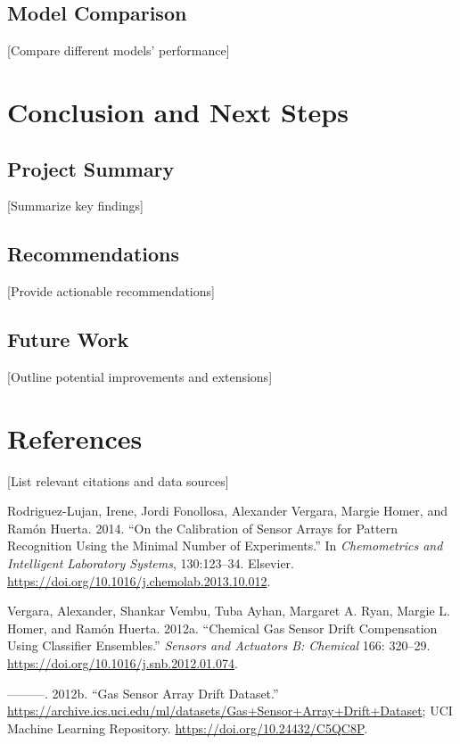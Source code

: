 \documentclass[
  letterpaper,
  DIV=11,
  numbers=noendperiod]{scrartcl}
\newlength{\cslhangindent}
\newenvironment{CSLReferences}[2] %
 {\begin{list}{}{%
  \setlength{\itemindent}{0pt}
  \setlength{\leftmargin}{0pt}
  \setlength{\parsep}{0pt}
  \ifodd #1
   \setlength{\leftmargin}{\cslhangindent}
   \setlength{\itemindent}{-1\cslhangindent}
  \fi
  \setlength{\itemsep}{#2\baselineskip}}}
 {\end{list}}
\begin{document}
\subsection{Model Comparison}\label{model-comparison}

{[}Compare different models' performance{]}

\section{Conclusion and Next Steps}\label{conclusion-and-next-steps}

\subsection{Project Summary}\label{project-summary}

{[}Summarize key findings{]}

\subsection{Recommendations}\label{recommendations}

{[}Provide actionable recommendations{]}

\subsection{Future Work}\label{future-work}

{[}Outline potential improvements and extensions{]}

\section{References}\label{references}

{[}List relevant citations and data sources{]}

\label{refs}
\begin{CSLReferences}{1}{0}
Rodriguez-Lujan, Irene, Jordi Fonollosa, Alexander Vergara, Margie
Homer, and Ramón Huerta. 2014. {``On the Calibration of Sensor Arrays
for Pattern Recognition Using the Minimal Number of Experiments.''} In
\emph{Chemometrics and Intelligent Laboratory Systems}, 130:123--34.
Elsevier. \url{https://doi.org/10.1016/j.chemolab.2013.10.012}.

Vergara, Alexander, Shankar Vembu, Tuba Ayhan, Margaret A. Ryan, Margie
L. Homer, and Ramón Huerta. 2012a. {``Chemical Gas Sensor Drift
Compensation Using Classifier Ensembles.''} \emph{Sensors and Actuators
B: Chemical} 166: 320--29.
\url{https://doi.org/10.1016/j.snb.2012.01.074}.

---------. 2012b. {``Gas Sensor Array Drift Dataset.''}
\url{https://archive.ics.uci.edu/ml/datasets/Gas+Sensor+Array+Drift+Dataset};
UCI Machine Learning Repository. \url{https://doi.org/10.24432/C5QC8P}.

\end{CSLReferences}
\end{document}
